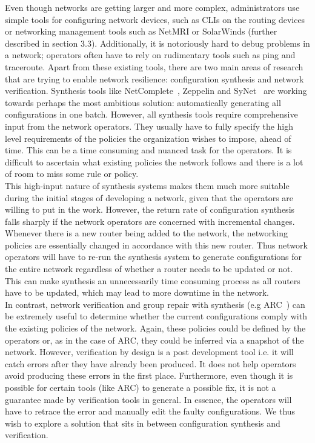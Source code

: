 \documentclass[../thesis.tex]{subfiles}
\begin{document}
Even though networks are getting larger and more complex, administrators use simple tools for configuring network devices, such as CLIs on the routing devices or networking management tools such as NetMRI or SolarWinds (further described in section 3.3). Additionally, it is notoriously hard to debug problems in a network; operators often have to rely on rudimentary tools such as ping and traceroute. Apart from these existing tools, there are two main areas of research that are trying to enable network resilience: configuration synthesis and network verification. Synthesis tools like NetComplete~\cite{NetComplete}, Zeppelin and SyNet~\cite{synet} are working towards perhaps the most ambitious solution: automatically generating all configurations in one batch. However, all synthesis tools require comprehensive input from the network operators. They usually have to fully specify the high level requirements of the policies the organization wishes to impose, ahead of time. This can be a time consuming and nuanced task for the operators. It is difficult to ascertain what existing policies the network follows and there is a lot of room to miss some rule or policy.\\

This high-input nature of synthesis systems makes them much more suitable during the initial stages of developing a network, given that the operators are willing to put in the work. However, the return rate of configuration synthesis falls sharply if the network operators are concerned with incremental changes. Whenever there is a new router being added to the network, the networking policies are essentially changed in accordance with this new router. Thus network operators will have to re-run the synthesis system to generate configurations for the entire network regardless of whether a router needs to be updated or not. This can make synthesis an unnecessarily time consuming process as all routers have to be updated, which may lead to more downtime in the network.\\ 

In contrast, network verification and group repair with synthesis (e.g ARC~\cite{arc}) can be extremely useful to determine whether the current configurations comply with the existing policies of the network. Again, these policies could be defined by the operators or, as in the case of ARC, they could be inferred via a snapshot of the network. However, verification by design is a post development tool i.e. it will catch errors after they have already been produced. It does not help operators avoid producing these errors in the first place. Furthermore, even though it is possible for certain tools (like ARC) to generate a possible fix, it is not a guarantee made by verification tools in general. In essence, the operators will have to retrace the error and manually edit the faulty configurations. We thus wish to explore a solution that sits in between configuration synthesis and verification.\\
\end{document}
